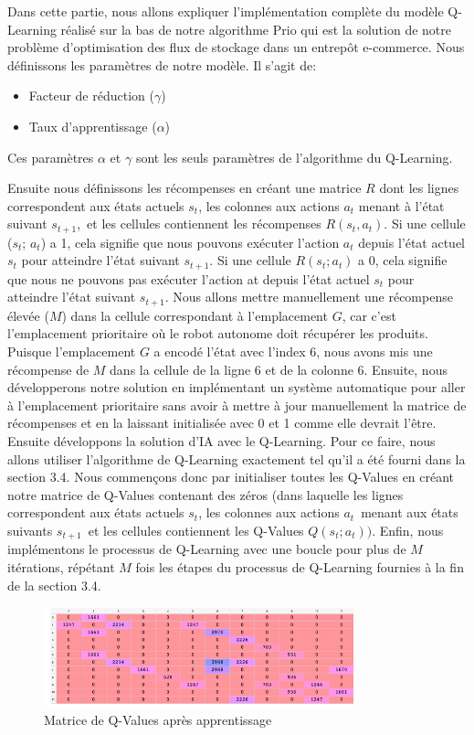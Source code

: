 \documentclass{article}
\begin{document}
Dans cette partie, nous allons expliquer l'implémentation complète du modèle Q-Learning réalisé sur la bas de notre algorithme Prio qui est  la solution de notre problème d'optimisation des flux de stockage dans un entrepôt e-commerce.
Nous définissons les paramètres de notre modèle. Il s'agit de: 
\begin{itemize}
    \item Facteur de réduction ($\gamma$)
    \item Taux d'apprentissage ($\alpha$)
\end{itemize}
Ces paramètres $\alpha$ et $\gamma$ sont les seuls paramètres de l'algorithme du Q-Learning.

 Ensuite nous définissons les récompenses en créant une matrice $R$ dont les lignes correspondent aux états actuels $s_t$, les colonnes aux actions $a_t$ menant à l'état suivant $s_{t+1}$,\  et les cellules contiennent les récompenses $R(s_t, a_t)$. Si une cellule ($s_t$; $a_t$) a 1, cela signifie que nous pouvons exécuter l'action $a_t$  depuis l'état actuel $s_t$ pour atteindre l'état suivant $s_{t+1}$. Si une cellule $R(s_t; a_t)$ a 0, cela signifie que nous ne pouvons pas exécuter l'action at depuis l'état actuel $s_t$ pour atteindre l'état suivant $s_{t+1}$. Nous allons mettre manuellement une récompense élevée ($M$) dans la cellule correspondant à l'emplacement $G$, car c'est l'emplacement prioritaire où le robot autonome doit récupérer les produits. Puisque l'emplacement $G$ a encodé l'état avec l'index 6, nous avons mis une récompense de $M$ dans la cellule de la ligne 6 et de la colonne 6. Ensuite, nous développerons notre solution en implémentant un système automatique pour aller à l'emplacement prioritaire sans avoir à mettre à jour manuellement la matrice de récompenses et en la laissant initialisée avec 0 et 1 comme elle devrait l'être. Ensuite développons la solution d'IA avec le Q-Learning. Pour ce faire, nous allons utiliser l'algorithme de Q-Learning exactement tel qu'il a été fourni dans la section 3.4. Nous commençons donc par initialiser toutes les Q-Values en créant notre matrice de Q-Values contenant des zéros (dans laquelle les lignes correspondent aux états actuels $s_t$, les colonnes aux actions $a_t$\ menant aux états suivants $s_{t+1}$\ et les cellules contiennent les Q-Values $Q(s_t; a_t))$. Enfin, nous implémentons le processus de Q-Learning avec une boucle pour plus de  $M$ itérations, répétant  $M$ fois les étapes du processus de Q-Learning fournies à la fin de la section 3.4.

\begin{figure}[h]
    \centering
    \includegraphics[width=0.8\textwidth]{image4.png} 
    \caption{Matrice de Q-Values après apprentissage}
    \label{fig:Matrice de Q-Values après apprentissage}
\end{figure}
\end{document}
